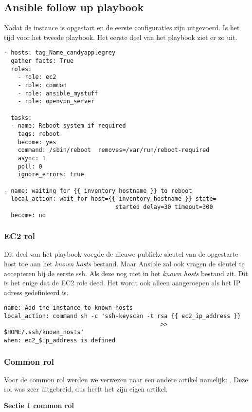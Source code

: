 \subsection{Ansible follow up playbook}
Nadat de instance is opgestart en de eerste configuraties zijn uitgevoerd. Is het tijd voor het tweede playbook. Het eerste deel van het playbook ziet er zo uit.
\begin{lstlisting}
- hosts: tag_Name_candyapplegrey
  gather_facts: True
  roles:
    - role: ec2
    - role: common
    - role: ansible_mystuff
    - role: openvpn_server

  tasks:
  - name: Reboot system if required
    tags: reboot
    become: yes
    command: /sbin/reboot  removes=/var/run/reboot-required 
    async: 1
    poll: 0
    ignore_errors: true

- name: waiting for {{ inventory_hostname }} to reboot
  local_action: wait_for host={{ inventory_hostname }} state=
                                started delay=30 timeout=300 
  become: no
\end{lstlisting}

\subsubsection{EC2 rol}
Dit deel van het playbook voegde de nieuwe publieke sleutel van de opgestarte host toe aan het \textit{known hosts} bestand. Maar Ansible zal ook vragen de sleutel te accepteren bij de eerste ssh. Als deze nog niet in het \textit{known hosts} bestand zit. Dit is het enige dat de EC2 role deed. Het wordt ook alleen aangeroepen als het IP adress gedefinieerd is.
\begin{lstlisting}
name: Add the instance to known hosts
local_action: command sh -c 'ssh-keyscan -t rsa {{ ec2_ip_address }}
                                             >> $HOME/.ssh/known_hosts'
when: ec2_$ip_address is defined
\end{lstlisting}

\newpage
\subsubsection{Common rol}
Voor de common rol werden we verwezen naar een andere artikel namelijk: \autocite{commonscottharney}. Deze rol was zeer uitgebreid, dus heeft het zijn eigen artikel.


\textbf{Sectie 1 common rol}

